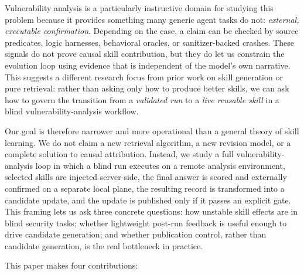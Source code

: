 ﻿\documentclass[preprint,12pt]{elsarticle}
\begin{document}
Vulnerability analysis is a particularly instructive domain for studying
this problem because it provides something many generic agent tasks do not:
\emph{external, executable confirmation}.  Depending on the case, a claim
can be checked by source predicates, logic harnesses, behavioral oracles,
or sanitizer-backed crashes.  These signals do not prove causal skill
contribution, but they do let us constrain the evolution loop using
evidence that is independent of the model's own narrative.  This suggests a
different research focus from prior work on skill generation or pure
retrieval: rather than asking only how to produce better skills, we can ask
how to govern the transition from a \emph{validated run} to a \emph{live
reusable skill} in a blind vulnerability-analysis workflow.

Our goal is therefore narrower and more operational than a general theory
of skill learning.  We do not claim a new retrieval algorithm, a new
revision model, or a complete solution to causal attribution.  Instead, we
study a full vulnerability-analysis loop in which a blind run executes on a
remote analysis environment, selected skills are injected server-side, the
final answer is scored and externally confirmed on a separate local plane,
the resulting record is transformed into a candidate update, and the update
is published only if it passes an explicit gate.  This framing lets us ask
three concrete questions: how unstable skill effects are in blind security
tasks; whether lightweight post-run feedback is useful enough to drive
candidate generation; and whether publication control, rather than
candidate generation, is the real bottleneck in practice.

This paper makes four contributions:
\end{document}
